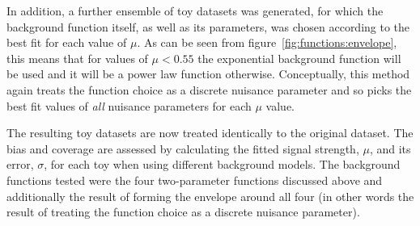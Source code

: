 In addition, a further ensemble of toy datasets was generated, for which the background function itself, as well 
as its parameters, was chosen according to the best fit for each value of $\mu$. As can be seen from 
figure~\ref{fig:functions:envelope}, this means that for values of $\mu < 0.55$ the exponential background 
function will be used and it will be a power law function otherwise.
Conceptually, this method again
treats the function choice as a discrete nuisance parameter and so picks the
best fit values of {\em all\/} nuisance parameters for each $\mu$ value.

The resulting toy datasets are now treated identically to the original dataset. The bias and coverage are assessed by calculating the fitted signal strength, $\mu$, and its error, $\sigma$, for each toy when using different background models. The background functions tested were the four two-parameter functions discussed above and additionally the result of forming the envelope around all four (in other words the result of treating the function choice as a discrete nuisance parameter). 

